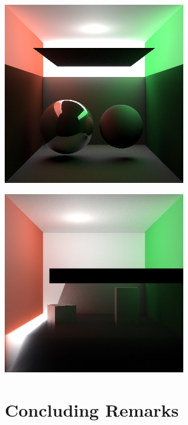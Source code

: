 \documentclass[10pt,compress,professionalfont]{beamer}
\begin{document}
\begin{frame}[c]{}

    {\centering
    \includegraphics[width=80mm]{../img/two_sphere_indir}\\
    }

\end{frame}




\begin{frame}[c]{}

    {\centering
    \includegraphics[width=80mm]{../img/one_side_corrected}\\
    }

\end{frame}




\section{Concluding Remarks}
\end{document}

